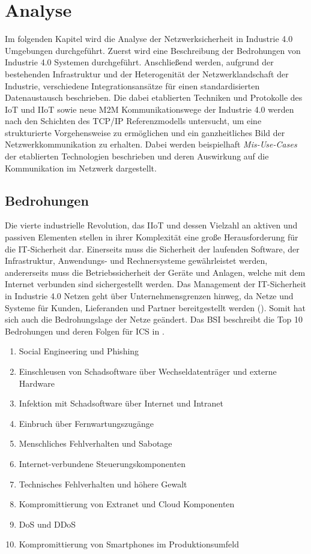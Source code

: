 \chapter{Analyse}
\label{Analyse}
Im folgenden Kapitel wird die Analyse der Netzwerksicherheit in Industrie 4.0 Umgebungen durchgeführt. Zuerst wird eine Beschreibung der Bedrohungen von Industrie 4.0 Systemen durchgeführt. Anschließend werden, aufgrund der bestehenden Infrastruktur und der Heterogenität der Netzwerklandschaft der Industrie, verschiedene Integrationsansätze für einen standardisierten Datenaustausch beschrieben. Die dabei etablierten Techniken und Protokolle des \ac{IoT} und \ac{IIoT} sowie neue \ac{M2M} Kommunikationswege der Industrie 4.0 werden nach den Schichten des \ac{TCP}/\ac{IP} Referenzmodells untersucht, um eine strukturierte Vorgehensweise zu ermöglichen und ein ganzheitliches Bild der Netzwerkkommunikation zu erhalten. Dabei werden beispielhaft \textit{Mis-Use-Cases} der etablierten Technologien beschrieben und deren Auswirkung auf die Kommunikation im Netzwerk dargestellt.

\section{Bedrohungen}
\label{Analyse:Bedrohungen}
Die vierte industrielle Revolution, das \ac{IIoT} und dessen Vielzahl an aktiven und passiven Elementen stellen in ihrer Komplexität eine große Herausforderung für die IT-Sicherheit dar. Einerseits muss die Sicherheit der laufenden Software, der Infrastruktur, Anwendungs- und Rechnersysteme gewährleistet werden, andererseits muss die Betriebssicherheit der Geräte und Anlagen, welche mit dem Internet verbunden sind sichergestellt werden. Das Management der IT-Sicherheit in Industrie 4.0 Netzen geht über Unternehmensgrenzen hinweg, da Netze und Systeme für Kunden, Lieferanden und Partner bereitgestellt werden (\cite{DTAG2016}). Somit hat sich auch die Bedrohungslage der Netze geändert. Das \ac{BSI} beschreibt die Top 10 Bedrohungen und deren Folgen für \ac{ICS} in \cite{ICSSec2016}.

\begin{enumerate}
    \item Social Engineering und Phishing
    \item Einschleusen von Schadsoftware über Wechseldatenträger und externe Hardware
    \item Infektion mit Schadsoftware über Internet und Intranet
    \item Einbruch über Fernwartungszugänge
    \item Menschliches Fehlverhalten und Sabotage
    \item Internet-verbundene Steuerungskomponenten
    \item Technisches Fehlverhalten und höhere Gewalt
    \item Kompromittierung von Extranet und Cloud Komponenten
    \item \ac{DoS} und \ac{DDoS}
    \item Kompromittierung von Smartphones im Produktionsumfeld
\end{enumerate}

